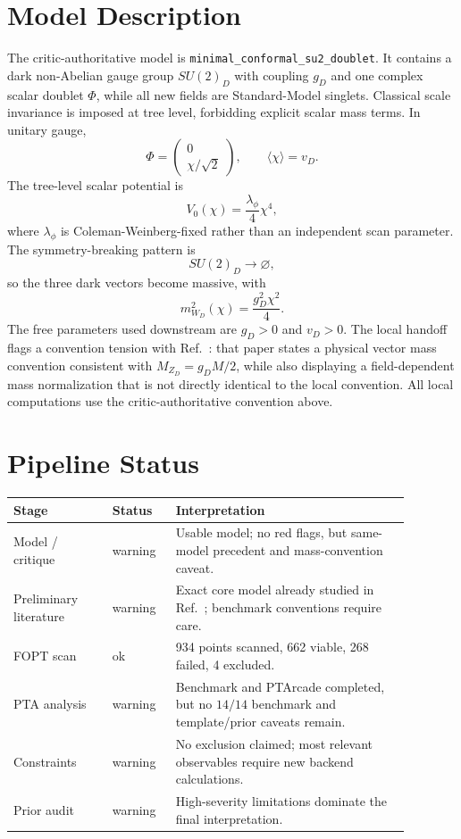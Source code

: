 \documentclass[11pt]{article}
\newcommand{\SUtwoD}{\ensuremath{SU(2)_D}}
\begin{document}
\section{Model Description}
The critic-authoritative model is \texttt{minimal\_conformal\_su2\_doublet}. It contains a dark non-Abelian gauge group \SUtwoD{} with coupling $g_D$ and one complex scalar doublet $\Phi$, while all new fields are Standard-Model singlets. Classical scale invariance is imposed at tree level, forbidding explicit scalar mass terms. In unitary gauge,
\[
\Phi=\begin{pmatrix}0\\ \chi/\sqrt{2}\end{pmatrix},\qquad \langle \chi\rangle=v_D .
\]
The tree-level scalar potential is
\[
V_0(\chi)=\frac{\lambda_\phi}{4}\chi^4,
\]
where $\lambda_\phi$ is Coleman-Weinberg-fixed rather than an independent scan parameter. The symmetry-breaking pattern is
\[
\SUtwoD \rightarrow \varnothing,
\]
so the three dark vectors become massive, with
\[
m^2_{W_D}(\chi)=\frac{g_D^2\chi^2}{4}.
\]
The free parameters used downstream are $g_D>0$ and $v_D>0$. The local handoff flags a convention tension with Ref.~\cite{Borah2021}: that paper states a physical vector mass convention consistent with $M_{Z_D}=g_D M/2$, while also displaying a field-dependent mass normalization that is not directly identical to the local convention. All local computations use the critic-authoritative convention above.

\section{Pipeline Status}
\begin{center}
\begin{tabular}{p{0.22\linewidth}p{0.14\linewidth}p{0.52\linewidth}}
\toprule
Stage & Status & Interpretation \\
\midrule
Model / critique & warning & Usable model; no red flags, but same-model precedent and mass-convention caveat. \\
Preliminary literature & warning & Exact core model already studied in Ref.~\cite{Borah2021}; benchmark conventions require care. \\
FOPT scan & ok & 934 points scanned, 662 viable, 268 failed, 4 excluded. \\
PTA analysis & warning & Benchmark and PTArcade completed, but no $14/14$ benchmark and template/prior caveats remain. \\
Constraints & warning & No exclusion claimed; most relevant observables require new backend calculations. \\
Prior audit & warning & High-severity limitations dominate the final interpretation. \\
\bottomrule
\end{tabular}
\end{center}
\end{document}
